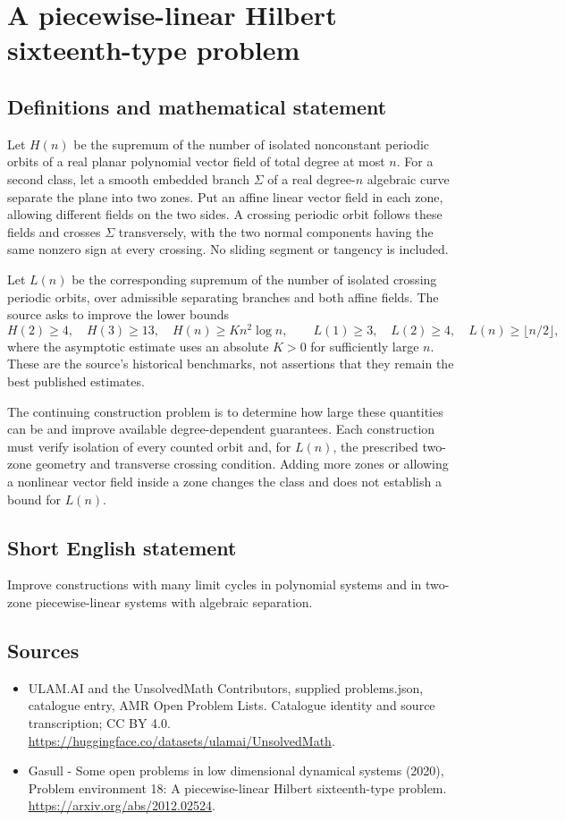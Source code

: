 \documentclass[11pt,a4paper]{article}
\begin{document}
\section*{A piecewise-linear Hilbert sixteenth-type problem}\label{statement}

\subsection{Definitions and mathematical statement}
Let $H(n)$ be the supremum of the number of isolated nonconstant periodic
orbits of a real planar polynomial vector field of total degree at most $n$.
For a second class, let a smooth embedded branch $\Sigma$ of a real
degree-$n$ algebraic curve separate the plane into two zones. Put an affine
linear vector field in each zone, allowing different fields on the two
sides. A crossing periodic orbit follows these fields and crosses $\Sigma$
transversely, with the two normal components having the same nonzero sign
at every crossing. No sliding segment or tangency is included.

Let $L(n)$ be the corresponding supremum of the number of isolated
crossing periodic orbits, over admissible separating branches and both
affine fields. The source asks to improve the lower bounds
\[
 H(2)\ge4,\quad H(3)\ge13,\quad H(n)\ge K n^2\log n,
 \qquad
 L(1)\ge3,\quad L(2)\ge4,\quad L(n)\ge\lfloor n/2\rfloor,
\]
where the asymptotic estimate uses an absolute $K>0$ for sufficiently large
$n$. These are the source's historical benchmarks, not assertions that
they remain the best published estimates.

The continuing construction problem is to determine how large these
quantities can be and improve available degree-dependent guarantees.
Each construction must verify isolation of every counted orbit and, for
$L(n)$, the prescribed two-zone geometry and transverse crossing condition.
Adding more zones or allowing a nonlinear vector field inside a zone
changes the class and does not establish a bound for $L(n)$.
\subsection{Short English statement}
Improve constructions with many limit cycles in polynomial systems and in two-zone piecewise-linear systems with algebraic separation.
\subsection{Sources}
\begin{itemize}
\item[S1] ULAM.AI and the UnsolvedMath Contributors, supplied problems.json, catalogue entry, AMR Open Problem Lists. Catalogue identity and source transcription; CC BY 4.0.
\url{https://huggingface.co/datasets/ulamai/UnsolvedMath}.
\item[S2] Gasull - Some open problems in low dimensional dynamical systems (2020), Problem environment 18: A piecewise-linear Hilbert sixteenth-type problem. 
\url{https://arxiv.org/abs/2012.02524}.
\end{itemize}
\end{document}
